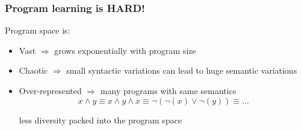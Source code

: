 \documentclass{beamer}
\newcommand{\AND}{\land}
\newcommand{\OR}{\lor}
\newcommand{\NOT}{\lnot}
\begin{document}
\frame
{

  \frametitle{Program learning is \alert{HARD!}}

  \pause

  Program space is:
  \begin{itemize}
  \item<+-> Vast
    $\Rightarrow$ \alert{grows exponentially} with program size\\
  \item<+-> Chaotic
    $\Rightarrow$ small syntactic variations can lead
    to \alert{huge semantic variations}\\
  \item<+-> Over-represented
    $\Rightarrow$ \alert{many programs with same semantics}\\
    \[x \AND y
    \equiv x \AND y \AND x
    \equiv \NOT(\NOT(x) \OR \NOT(y))
    \equiv \ldots\]
    
    \alert{less diversity} packed into the program space
  \end{itemize}
}
\end{document}
